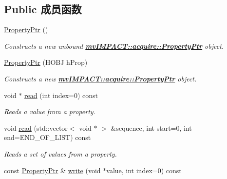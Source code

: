 \subsection*{Public 成员函数}
\begin{DoxyCompactItemize}
\item 
\hypertarget{classmv_i_m_p_a_c_t_1_1acquire_1_1_property_ptr_aed10120500a021c7e79ec0a1d5db9f22}{\hyperlink{classmv_i_m_p_a_c_t_1_1acquire_1_1_property_ptr_aed10120500a021c7e79ec0a1d5db9f22}{Property\+Ptr} ()}\label{classmv_i_m_p_a_c_t_1_1acquire_1_1_property_ptr_aed10120500a021c7e79ec0a1d5db9f22}

\begin{DoxyCompactList}\small\item\em Constructs a new unbound {\bfseries \hyperlink{classmv_i_m_p_a_c_t_1_1acquire_1_1_property_ptr}{mv\+I\+M\+P\+A\+C\+T\+::acquire\+::\+Property\+Ptr}} object. \end{DoxyCompactList}\item 
\hyperlink{classmv_i_m_p_a_c_t_1_1acquire_1_1_property_ptr_a5ef6bf69715608f5005385ba5a549bf0}{Property\+Ptr} (H\+O\+B\+J h\+Prop)
\begin{DoxyCompactList}\small\item\em Constructs a new {\bfseries \hyperlink{classmv_i_m_p_a_c_t_1_1acquire_1_1_property_ptr}{mv\+I\+M\+P\+A\+C\+T\+::acquire\+::\+Property\+Ptr}} object. \end{DoxyCompactList}\item 
void $\ast$ \hyperlink{classmv_i_m_p_a_c_t_1_1acquire_1_1_property_ptr_a1b3135b7b790e633fb19584dc568ce8c}{read} (int index=0) const 
\begin{DoxyCompactList}\small\item\em Reads a value from a property. \end{DoxyCompactList}\item 
void \hyperlink{classmv_i_m_p_a_c_t_1_1acquire_1_1_property_ptr_a5d3a61bd288da31f272c2785a6c306d2}{read} (std\+::vector$<$ void $\ast$ $>$ \&sequence, int start=0, int end=E\+N\+D\+\_\+\+O\+F\+\_\+\+L\+I\+S\+T) const 
\begin{DoxyCompactList}\small\item\em Reads a set of values from a property. \end{DoxyCompactList}\item 
const \hyperlink{classmv_i_m_p_a_c_t_1_1acquire_1_1_property_ptr}{Property\+Ptr} \& \hyperlink{classmv_i_m_p_a_c_t_1_1acquire_1_1_property_ptr_a066688198e3f6945d052724c410b30ca}{write} (void $\ast$value, int index=0) const 

\end{DoxyCompactItemize}
